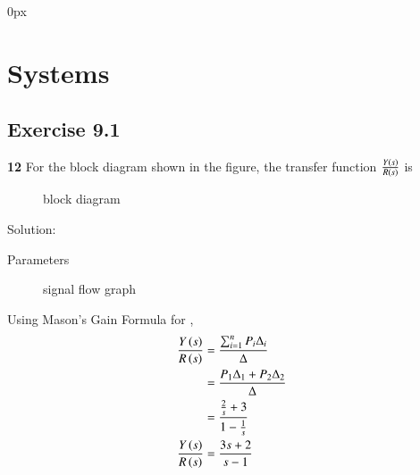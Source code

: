 \documentclass[journal,12pt,twocolumn]{IEEEtran}
\theoremstyle{remark}
\begin{document}
\parindent 0px


\vspace{3cm}

\title{}
\author{EE23BTECH11217 - Prajwal M$^{*}$
}
\maketitle
\newpage
\bigskip


\chapter{Systems}

\section*{Exercise 9.1}
\question
\noindent \textbf{12} \hspace{2pt}For the block diagram shown in the figure, the transfer function $\frac{Y\left(s\right)}{R\left(s\right)}$ is \\
\begin{figure}[h]
    \centering
    
    \caption{block diagram}
    \label{fig:9.1.12.1}
\end{figure}

Solution:\\
\solution
\begin{table}[h]
    \centering
    
    \caption{Parameters}
    \label{tab:9.1.12.1}
\end{table}

\begin{figure}[h]
    \centering
    
    \caption{signal flow graph}
    \label{fig: 9.1.12.2}
\end{figure}

Using Mason's Gain Formula for ,
\begin{align}
    \frac{Y\left(s\right)}{R\left(s\right)} & = \frac{{\sum_{i=1}^{n} P_i\Delta_i}}{{\Delta}}\\
    & = \frac{P_1\Delta_1 + P_2\Delta_2}{\Delta}\\
    & = \frac{\frac{2}{s} + 3}{1 - \frac{1}{s}}\\
    \frac{Y\left(s\right)}{R\left(s\right)} & = \frac{3s+2}{s-1}
\end{align}
\end{document}
